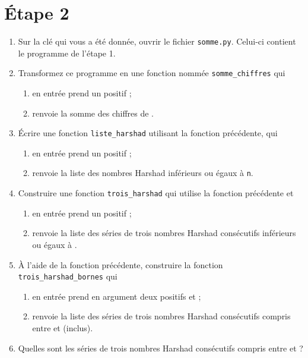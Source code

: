 \section*{\'Etape 2}
\begin{enumerate}[\bfseries 1.]
	\item Sur la clé qui vous a été donnée, ouvrir le fichier \texttt{somme.py}. Celui-ci contient le programme de l'étape 1.

\item Transformez ce programme  en une fonction nommée \texttt{somme\_chiffres} qui 
	\begin{enumerate}[--]
		\item 	en entrée prend un  positif ;
		\item 	renvoie la somme des chiffres de .
	\end{enumerate}

\item \'Ecrire une fonction \texttt{liste\_harshad} utilisant la fonction précédente,  qui 
	\begin{enumerate}[--]
	\item 	en entrée prend un  positif ;
	\item 	renvoie la liste des nombres Harshad inférieurs ou égaux à \texttt{n}. 
\end{enumerate}

\item  Construire une fonction  \texttt{trois\_harshad} qui utilise la fonction précédente et
		\begin{enumerate}[--]
			\item 	en entrée prend un  positif ;
			\item 	renvoie la liste des séries de trois nombres Harshad consécutifs inférieurs ou égaux à .
		\end{enumerate}
\item À l'aide de la fonction précédente, construire la fonction  \texttt{trois\_harshad\_bornes} qui 
	\begin{enumerate}[--]
		\item	en entrée prend en argument deux  positifs  et ; 
		\item 	renvoie la liste des séries de trois nombres Harshad consécutifs compris entre  et  (inclus).
	\end{enumerate}


\item 	Quelles sont les séries de trois nombres Harshad consécutifs compris entre  et  ?


\end{enumerate}
